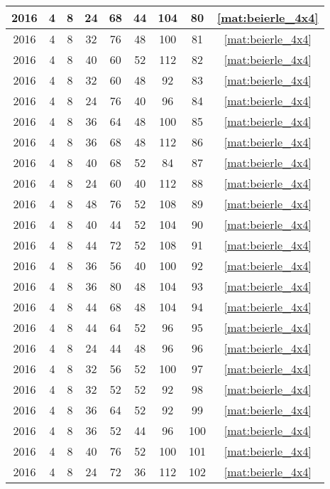 \begin{longtable}{|c|c|c|c|c|c|c|c|c|}
2016 & 4 & 8 & 24 & 68 & 44 & 104 & 80 & \eqref{mat:beierle_4x4} \\ \hline 
2016 & 4 & 8 & 32 & 76 & 48 & 100 & 81 & \eqref{mat:beierle_4x4} \\ \hline 
2016 & 4 & 8 & 40 & 60 & 52 & 112 & 82 & \eqref{mat:beierle_4x4} \\ \hline 
2016 & 4 & 8 & 32 & 60 & 48 & 92 & 83 & \eqref{mat:beierle_4x4} \\ \hline 
2016 & 4 & 8 & 24 & 76 & 40 & 96 & 84 & \eqref{mat:beierle_4x4} \\ \hline 
2016 & 4 & 8 & 36 & 64 & 48 & 100 & 85 & \eqref{mat:beierle_4x4} \\ \hline 
2016 & 4 & 8 & 36 & 68 & 48 & 112 & 86 & \eqref{mat:beierle_4x4} \\ \hline 
2016 & 4 & 8 & 40 & 68 & 52 & 84 & 87 & \eqref{mat:beierle_4x4} \\ \hline 
2016 & 4 & 8 & 24 & 60 & 40 & 112 & 88 & \eqref{mat:beierle_4x4} \\ \hline 
2016 & 4 & 8 & 48 & 76 & 52 & 108 & 89 & \eqref{mat:beierle_4x4} \\ \hline 
2016 & 4 & 8 & 40 & 44 & 52 & 104 & 90 & \eqref{mat:beierle_4x4} \\ \hline 
2016 & 4 & 8 & 44 & 72 & 52 & 108 & 91 & \eqref{mat:beierle_4x4} \\ \hline 
2016 & 4 & 8 & 36 & 56 & 40 & 100 & 92 & \eqref{mat:beierle_4x4} \\ \hline 
2016 & 4 & 8 & 36 & 80 & 48 & 104 & 93 & \eqref{mat:beierle_4x4} \\ \hline 
2016 & 4 & 8 & 44 & 68 & 48 & 104 & 94 & \eqref{mat:beierle_4x4} \\ \hline 
2016 & 4 & 8 & 44 & 64 & 52 & 96 & 95 & \eqref{mat:beierle_4x4} \\ \hline 
2016 & 4 & 8 & 24 & 44 & 48 & 96 & 96 & \eqref{mat:beierle_4x4} \\ \hline 
2016 & 4 & 8 & 32 & 56 & 52 & 100 & 97 & \eqref{mat:beierle_4x4} \\ \hline 
2016 & 4 & 8 & 32 & 52 & 52 & 92 & 98 & \eqref{mat:beierle_4x4} \\ \hline 
2016 & 4 & 8 & 36 & 64 & 52 & 92 & 99 & \eqref{mat:beierle_4x4} \\ \hline 
2016 & 4 & 8 & 36 & 52 & 44 & 96 & 100 & \eqref{mat:beierle_4x4} \\ \hline 
2016 & 4 & 8 & 40 & 76 & 52 & 100 & 101 & \eqref{mat:beierle_4x4} \\ \hline 
2016 & 4 & 8 & 24 & 72 & 36 & 112 & 102 & \eqref{mat:beierle_4x4} \\ \hline 

\end{longtable}
